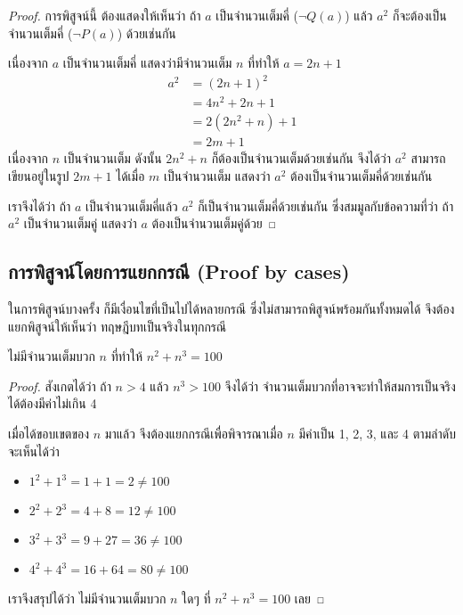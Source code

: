 \begin{proof}
การพิสูจน์นี้ ต้องแสดงให้เห็นว่า ถ้า $a$ เป็นจำนวนเต็มคี่ ($\neg Q(a)$) แล้ว $a^2$ ก็จะต้องเป็นจำนวนเต็มคี่ ($\neg P(a)$) ด้วยเช่นกัน

เนื่องจาก $a$ เป็นจำนวนเต็มคี่ แสดงว่ามีจำนวนเต็ม  $n$ ที่ทำให้ $a=2n+1$
\begin{align*}
a^2 &= (2n+1)^2 \\
&= 4n^2+2n+1 \\
&= 2(2n^2+n)+1 \\
&= 2m+1
\end{align*}
เนื่องจาก $n$ เป็นจำนวนเต็ม ดังนั้น $2n^2+n$ ก็ต้องเป็นจำนวนเต็มด้วยเช่นกัน จึงได้ว่า   $a^2$  สามารถเขียนอยู่ในรูป $2m+1$ ได้เมื่อ $m$ เป็นจำนวนเต็ม แสดงว่า $a^2$ ต้องเป็นจำนวนเต็มคี่ด้วยเช่นกัน

เราจึงได้ว่า ถ้า $a$ เป็นจำนวนเต็มคี่แล้ว $a^2$ ก็เป็นจำนวนเต็มคี่ด้วยเช่นกัน ซึ่งสมมูลกับข้อความที่ว่า ถ้า $a^2$ เป็นจำนวนเต็มคู่ แสดงว่า $a$ ต้องเป็นจำนวนเต็มคู่ด้วย
\end{proof}

\subsection{การพิสูจน์โดยการแยกกรณี (Proof by cases)}

ในการพิสูจน์บางครั้ง ก็มีเงื่อนไขที่เป็นไปได้หลายกรณี ซึ่งไม่สามารถพิสูจน์พร้อมกันทั้งหมดได้ จึงต้องแยกพิสูจน์ให้เห็นว่า ทฤษฎีบทเป็นจริงในทุกกรณี

\begin{theorem}
ไม่มีจำนวนเต็มบวก $n$ ที่ทำให้ $n^2+n^3=100$
\end{theorem}

\begin{proof}
สังเกตได้ว่า ถ้า $n>4$ แล้ว $n^3>100$  จึงได้ว่า จำนวนเต็มบวกที่อาจจะทำให้สมการเป็นจริงได้ต้องมีค่าไม่เกิน 4

เมื่อได้ขอบเขตของ $n$ มาแล้ว จึงต้องแยกกรณีเพื่อพิจารณาเมื่อ $n$ มีค่าเป็น 1, 2, 3, และ 4 ตามลำดับ จะเห็นได้ว่า
\begin{itemize}
\item $1^2 + 1^3 = 1+1 = 2 \neq 100$
\item $2^2 + 2^3 = 4+8 = 12 \neq 100$
\item $3^2 + 3^3 = 9+27 = 36 \neq 100$
\item $4^2 + 4^3 = 16+64 = 80 \neq 100$
\end{itemize}
เราจึงสรุปได้ว่า ไม่มีจำนวนเต็มบวก $n$ ใดๆ ที่ $n^2+n^3=100$ เลย
\end{proof}

